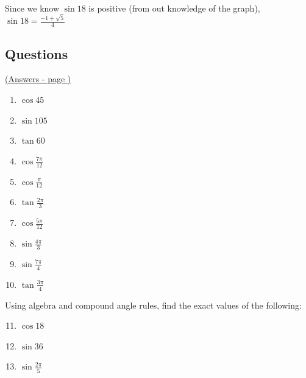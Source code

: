 \documentclass[../main.tex]{subfiles}
\begin{document}
Since we know $\sin{18}$ is positive (from out knowledge of the graph), $\sin{18}=\frac{-1+\sqrt{5}}{4}$

\pagebreak
\hypertarget{exacttriglink}{\subsection*{Questions}}
\hyperlink{exacttriganswers}{(Answers - page {\pageref*{Exact trig values answers}})}


\label{Exact trig values}

\begin{enumerate}
    \item $\cos{45}$

    \item $\sin{105}$
    
    \item $\tan{60}$
    
    \item $\cos{\frac{7\pi}{12}}$
    
    \item $\cos{\frac{\pi}{12}}$
    
    \item $\tan{\frac{2\pi}{3}}$
    
    \item $\cos{\frac{5\pi}{12}}$
    
    \item $\sin{\frac{4\pi}{3}}$
    
    \item $\sin{\frac{7\pi}{4}}$
    
    \item $\tan{\frac{3\pi}{4}}$

\end{enumerate}
Using algebra and compound angle rules, find the exact values of the following:
\begin{enumerate}
    \setcounter{enumi}{10}
    \item $\cos{18}$
    
    \item $\sin{36}$
    
    \item $\sin{\frac{2\pi}{5}}$
    
\end{enumerate}
\end{document}
